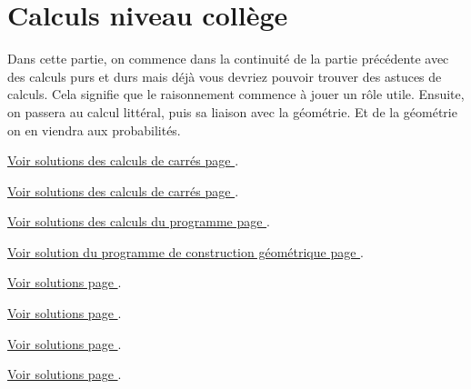 \section{Calculs niveau collège}

Dans cette partie, on commence dans la continuité de la partie précédente avec des calculs purs et durs mais déjà vous devriez pouvoir trouver des astuces de calculs. Cela signifie que le raisonnement commence à jouer un rôle utile. Ensuite, on passera au calcul littéral, puis sa liaison avec la géométrie. Et de la géométrie on en viendra aux probabilités. 

\newpage



\hyperref[sol:niveau7]{Voir solutions des calculs de carrés page \pageref{sol:niveau7}}.

\newpage



\hyperref[sol:niveau8]{Voir solutions des calculs de carrés page \pageref{sol:niveau8}}.


\newpage 



\hyperref[sol:niveau9]{Voir solutions des calculs du programme page \pageref{sol:niveau9}}.

\newpage 



\hyperref[sol:niveau10]{Voir solution du programme de construction géométrique page \pageref{sol:niveau10}}.

\newpage




\hyperref[sol:niveau11]{Voir solutions page \pageref{sol:niveau11}}.

\newpage




\hyperref[sol:niveau12]{Voir solutions page \pageref{sol:niveau12}}.

\newpage





\hyperref[sol:niveau13]{Voir solutions page \pageref{sol:niveau13}}.


\newpage 




\hyperref[sol:niveau14]{Voir solutions page \pageref{sol:niveau14}}.

\newpage



